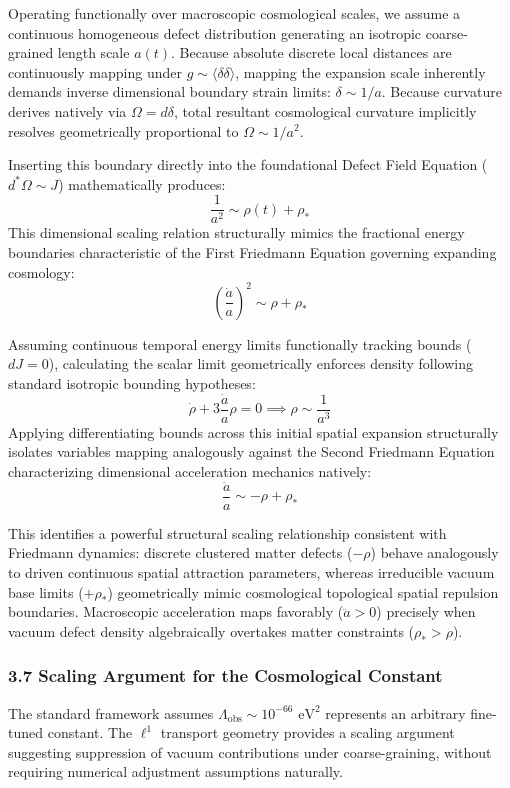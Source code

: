\documentclass[
]{article}
\begin{document}
Operating functionally over macroscopic cosmological scales, we assume a
continuous homogeneous defect distribution generating an isotropic
coarse-grained length scale \(a(t)\). Because absolute discrete local
distances are continuously mapping under
\(g \sim \langle \delta\delta \rangle\), mapping the expansion scale
inherently demands inverse dimensional boundary strain limits:
\(\delta \sim 1/a\). Because curvature derives natively via
\(\Omega = d\delta\), total resultant cosmological curvature implicitly
resolves geometrically proportional to \(\Omega \sim 1/a^2\).

Inserting this boundary directly into the foundational Defect Field
Equation (\(d^*\Omega \sim J\)) mathematically produces:
\[ \frac{1}{a^2} \sim \rho(t) + \rho_* \] This dimensional scaling
relation structurally mimics the fractional energy boundaries
characteristic of the First Friedmann Equation governing expanding
cosmology: \[ \left(\frac{\dot{a}}{a}\right)^2 \sim \rho + \rho_* \]

Assuming continuous temporal energy limits functionally tracking bounds
(\(dJ = 0\)), calculating the scalar limit geometrically enforces
density following standard isotropic bounding hypotheses:
\[ \dot{\rho} + 3\frac{\dot{a}}{a}\rho = 0 \implies \rho \sim \frac{1}{a^3} \]
Applying differentiating bounds across this initial spatial expansion
structurally isolates variables mapping analogously against the Second
Friedmann Equation characterizing dimensional acceleration mechanics
natively: \[ \frac{\ddot{a}}{a} \sim -\rho + \rho_* \]

This identifies a powerful structural scaling relationship consistent
with Friedmann dynamics: discrete clustered matter defects (\(-\rho\))
behave analogously to driven continuous spatial attraction parameters,
whereas irreducible vacuum base limits (\(+\rho_*\)) geometrically mimic
cosmological topological spatial repulsion boundaries. Macroscopic
acceleration maps favorably (\(\ddot{a} > 0\)) precisely when vacuum
defect density algebraically overtakes matter constraints
(\(\rho_* > \rho\)).

\subsubsection{3.7 Scaling Argument for the Cosmological
Constant}\label{scaling-argument-for-the-cosmological-constant}

The standard framework assumes
\(\Lambda_{\text{obs}} \sim 10^{-66} \text{ eV}^2\) represents an
arbitrary fine-tuned constant. The \(\ell^1\) transport geometry
provides a scaling argument suggesting suppression of vacuum
contributions under coarse-graining, without requiring numerical
adjustment assumptions naturally.
\end{document}
